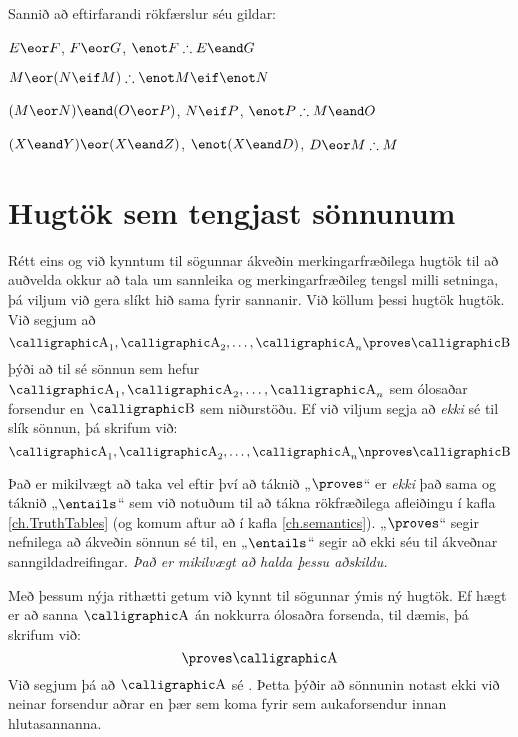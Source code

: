 \problempart 
Sannið að eftirfarandi rökfærslur séu gildar:
\begin{earg}
\item $E\eor F$, $F\eor G$, $\enot F \therefore E \eand G$
\item $M\eor(N\eif M) \therefore \enot M \eif \enot N$
\item $(M \eor N) \eand (O \eor P)$, $N \eif P$, $\enot P \therefore M\eand O$
\item $(X\eand Y)\eor(X\eand Z)$, $\enot(X\eand D)$, $D\eor M \therefore M$
\end{earg}

\chapter{Hugtök sem tengjast sönnunum}\label{s:ProofTheoreticConcepts}

Rétt eins og við kynntum til sögunnar ákveðin merkingarfræðilega hugtök til að auðvelda okkur að tala um sannleika og merkingarfræðileg tengsl milli setninga, þá viljum við gera slíkt hið sama fyrir sannanir. Við köllum þessi hugtök  hugtök. Við segjum að 
$$\meta{A}_1, \meta{A}_2, \ldots, \meta{A}_n \proves \meta{B}$$ þýði að til sé sönnun sem hefur $\meta{A}_1, \meta{A}_2, \ldots, \meta{A}_n$ sem ólosaðar forsendur en $\meta{B}$ sem niðurstöðu. Ef við viljum segja að \emph{ekki} sé til slík sönnun, þá skrifum við:$$\meta{A}_1, \meta{A}_2, \ldots, \meta{A}_n \nproves \meta{B}$$

Það er mikilvægt að taka vel eftir því að táknið „$\proves$“ er \emph{ekki} það sama og táknið „$\entails$“ sem við notuðum til að tákna rökfræðilega afleiðingu í kafla \ref{ch.TruthTables} (og komum aftur að í kafla \ref{ch.semantics}). „$\proves$“ segir nefnilega að ákveðin sönnun sé til, en „$\entails$“ segir að ekki séu til ákveðnar sanngildadreifingar. \emph{Það er mikilvægt að halda þessu aðskildu.}

Með þessum nýja rithætti getum við kynnt til sögunnar ýmis ný hugtök. Ef hægt er að sanna $\meta{A}$ án nokkurra ólosaðra forsenda, til dæmis, þá skrifum við: $${} \proves \meta{A}$$ Við segjum þá að $\meta{A}$ sé . Þetta þýðir að sönnunin notast ekki við neinar forsendur aðrar en þær sem koma fyrir sem aukaforsendur innan hlutasannanna.


